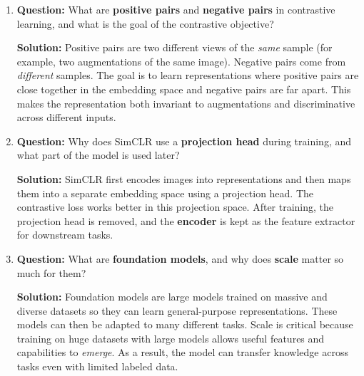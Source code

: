 \documentclass{article}
\begin{document}
\begin{enumerate}
\item \textbf{Question:} 
What are \textbf{positive pairs} and \textbf{negative pairs} in contrastive learning, and what is the goal of the contrastive objective?

\textbf{Solution:}  
Positive pairs are two different views of the \emph{same} sample (for example, two augmentations of the same image). Negative pairs come from \emph{different} samples.  
The goal is to learn representations where positive pairs are close together in the embedding space and negative pairs are far apart. This makes the representation both invariant to augmentations and discriminative across different inputs.

\item \textbf{Question:} 
Why does SimCLR use a \textbf{projection head} during training, and what part of the model is used later?

\textbf{Solution:}  
SimCLR first encodes images into representations and then maps them into a separate embedding space using a projection head. The contrastive loss works better in this projection space.  
After training, the projection head is removed, and the \textbf{encoder} is kept as the feature extractor for downstream tasks.

\item \textbf{Question:} 
What are \textbf{foundation models}, and why does \textbf{scale} matter so much for them?

\textbf{Solution:}  
Foundation models are large models trained on massive and diverse datasets so they can learn general-purpose representations. These models can then be adapted to many different tasks.  
Scale is critical because training on huge datasets with large models allows useful features and capabilities to \emph{emerge}. As a result, the model can transfer knowledge across tasks even with limited labeled data.
\end{enumerate}
\end{document}
